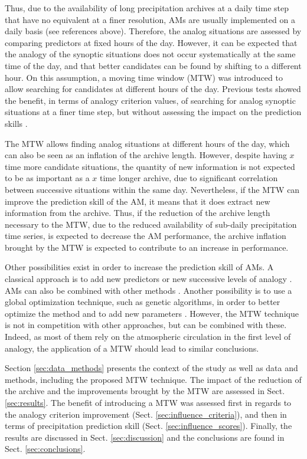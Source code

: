 \documentclass[hess, manuscript]{copernicus}
\begin{document}
Thus, due to the availability of long precipitation archives at a daily time step that have no equivalent at a finer resolution, AMs are usually implemented on a daily basis (see references above). Therefore, the analog situations are assessed by comparing predictors at fixed hours of the day. However, it can be expected that the analogy of the synoptic situations does not occur systematically at the same time of the day, and that better candidates can be found by shifting to a different hour. On this assumption, a moving time window (MTW) was introduced to allow searching for candidates at different hours of the day. Previous tests showed the benefit, in terms of analogy criterion values, of searching for analog synoptic situations at a finer time step, but without assessing the impact on the prediction skills \citep{Finet2008}.

The MTW allows finding analog situations at different hours of the day, which can also be seen as an inflation of the archive length. However, despite having $x$ time more candidate situations, the quantity of new information is not expected to be as important as a $x$ time longer archive, due to significant correlation between successive situations within the same day. Nevertheless, if the MTW can improve the prediction skill of the AM, it means that it does extract new information from the archive. Thus, if the reduction of the archive length necessary to the MTW, due to the reduced availability of sub-daily precipitation time series, is expected to decrease the AM performance, the archive inflation brought by the MTW is expected to contribute to an increase in performance.

Other possibilities exist in order to increase the prediction skill of AMs. A classical approach is to add new predictors or new successive levels of analogy \citep[see e.g.][]{Horton2012a, BenDaoud2016, Caillouet2016}. AMs can also be combined with other methods \citep[see e.g.][]{Chardon2014}. Another possibility is to use a global optimization technique, such as genetic algorithms, in order to better optimize the method and to add new parameters \citep{Horton2016}. However, the MTW technique is not in competition with other approaches, but can be combined with these. Indeed, as most of them rely on the atmospheric circulation in the first level of analogy, the application of a MTW should lead to similar conclusions.

Section \ref{sec:data_methods} presents the context of the study as well as data and methods, including the proposed MTW technique. The impact of the reduction of the archive and the improvements brought by the MTW are assessed in Sect. \ref{sec:results}. The benefit of introducing a MTW was assessed first in regards to the analogy criterion improvement (Sect. \ref{sec:influence_criteria}), and then in terms of precipitation prediction skill (Sect. \ref{sec:influence_scores}). Finally, the results are discussed in Sect. \ref{sec:discussion} and the conclusions are found in Sect. \ref{sec:conclusions}.
\end{document}
